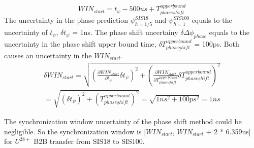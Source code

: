 \begin{equation}
WIN_{start} = t_{\psi} - 500us + T_{phase\underline shift}^{upper\underline bound} \label{Phase_win}
\end{equation}
The uncertainty in the phase prediction $\psi_{h=1/5}^{SIS18}$ and $\psi_{h=1}^{SIS100}$ equals to the uncertainty of $t_{\psi}$, $\delta t_{\psi}$ = 1ns. The phase shift uncertainy $\delta \Delta \phi_{phase}$ equals to the uncertainty in the phase shift upper bound time, $\delta T_{phase\underline shift}^{upper\underline bound}$ = 100ps. Both causes an uncertainty in the $WIN_{start}$.
\begin{equation}
\begin{aligned}
\delta WIN_{start} =\sqrt {(\frac {\partial WIN_{start}}{\partial t_{\psi}}\delta t_{\psi})^2 + (\frac {\partial WIN_{start}}{\partial T_{phase\underline shift}^{upper\underline bound}}\delta T_{phase\underline shift}^{upper\underline bound})^2} \\
 =\sqrt {(\delta t_{\psi})^2+(T_{phase\underline shift}^{upper\underline bound})^2} =\sqrt { 1ns^2+100ps^2}= 1ns \label{Phase_uncertainty}
\end{aligned}
\end{equation}

The synchronization window uncertainty of the phase shift method could be negligible. So the synchronization window is [$WIN_{start}$, $WIN_{start}$ + 2 * 6.359us] for $U^{28+}$ B2B transfer from SIS18 to SIS100.
